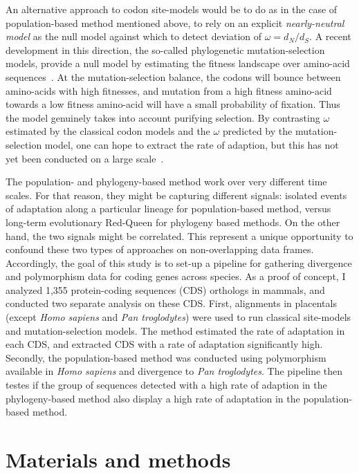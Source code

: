 \documentclass{article}
\begin{document}
An alternative approach to codon site-models would be to do as in the case of population-based method mentioned above, to rely on an explicit \textit{nearly-neutral model} as the null model against which to detect deviation of $\omega=d_N/d_S$.
A recent development in this direction, the so-called phylogenetic mutation-selection models, provide a null model by estimating the fitness landscape over amino-acid sequences~\citep{Yang2008, Halpern1998, Rodrigue2010}.
At the mutation-selection balance, the codons will bounce between amino-acids with high fitnesses, and mutation from a high fitness amino-acid towards a low fitness amino-acid will have a small probability of fixation.
Thus the model genuinely takes into account purifying selection.
By contrasting $\omega$ estimated by the classical codon models and the $\omega$ predicted by the mutation-selection model, one can hope to extract the rate of adaption, but this has not yet been conducted on a large scale~\citep{Rodrigue2016}.

The population- and phylogeny-based method work over very different time scales.
For that reason, they might be capturing different signals: isolated events of adaptation along a particular lineage for population-based method, versus long-term evolutionary Red-Queen for phylogeny based methods.
On the other hand, the two signals might be correlated.
This represent a unique opportunity to confound these two types of approaches on non-overlapping data frames.
Accordingly, the goal of this study is to set-up a pipeline for gathering divergence and polymorphism data for coding genes across species.
As a proof of concept, I analyzed 1,355 protein-coding sequences (CDS) orthologs in mammals, and conducted two separate analysis on these CDS.
First, alignments in placentals (except \textit{Homo sapiens} and \textit{Pan troglodytes}) were used to run classical site-models and mutation-selection models.
The method estimated the rate of adaptation in each CDS, and extracted CDS with a rate of adaptation significantly high.
Secondly, the population-based method was conducted using polymorphism available in \textit{Homo sapiens} and divergence to \textit{Pan troglodytes}.
The pipeline then testes if the group of sequences detected with a high rate of adaption in the phylogeny-based method also display a high rate of adaptation in the population-based method.

\section*{Materials and methods}
\end{document}
